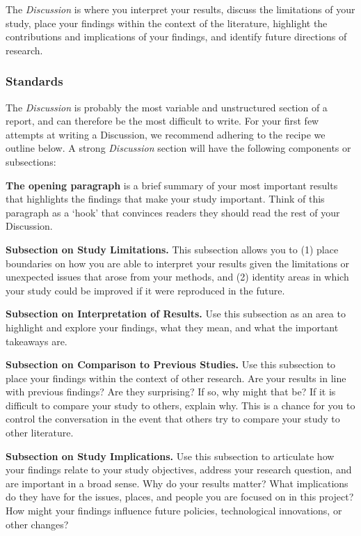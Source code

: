 \documentclass[
]{book}
\begin{document}
The \emph{Discussion} is where you interpret your results, discuss the limitations of your study, place your findings within the context of the literature, highlight the contributions and implications of your findings, and identify future directions of research.

\hypertarget{standards-4}{%
\subsubsection*{Standards}\label{standards-4}}

The \emph{Discussion} is probably the most variable and unstructured section of a report, and can therefore be the most difficult to write. For your first few attempts at writing a Discussion, we recommend adhering to the recipe we outline below. A strong \emph{Discussion} section will have the following components or subsections:

\textbf{The opening paragraph} is a brief summary of your most important results that highlights the findings that make your study important. Think of this paragraph as a `hook' that convinces readers they should read the rest of your Discussion.

\textbf{Subsection on Study Limitations.} This subsection allows you to (1) place boundaries on how you are able to interpret your results given the limitations or unexpected issues that arose from your methods, and (2) identity areas in which your study could be improved if it were reproduced in the future.

\textbf{Subsection on Interpretation of Results.} Use this subsection as an area to highlight and explore your findings, what they mean, and what the important takeaways are.

\textbf{Subsection on Comparison to Previous Studies.} Use this subsection to place your findings within the context of other research. Are your results in line with previous findings? Are they surprising? If so, why might that be? If it is difficult to compare your study to others, explain why. This is a chance for you to control the conversation in the event that others try to compare your study to other literature.

\textbf{Subsection on Study Implications.} Use this subsection to articulate how your findings relate to your study objectives, address your research question, and are important in a broad sense. Why do your results matter? What implications do they have for the issues, places, and people you are focused on in this project? How might your findings influence future policies, technological innovations, or other changes?
\end{document}
